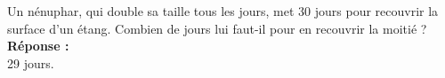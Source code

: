 Un nénuphar, qui double sa taille tous les jours, met 30 jours pour recouvrir 
la surface d'un étang. Combien de jours lui faut-il pour en recouvrir la 
moitié ?\\

\textbf{Réponse :}\\

29 jours.
